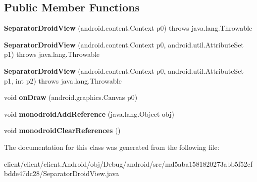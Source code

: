 \subsection*{Public Member Functions}
\begin{DoxyCompactItemize}
\item 
\hypertarget{classmd5aba1581820273abb5f52cfbdde47dc28_1_1SeparatorDroidView_a0ba746597f05250d7bbcbb774032b9b0}{}{\bfseries Separator\+Droid\+View} (android.\+content.\+Context p0)  throws java.\+lang.\+Throwable 	\label{classmd5aba1581820273abb5f52cfbdde47dc28_1_1SeparatorDroidView_a0ba746597f05250d7bbcbb774032b9b0}

\item 
\hypertarget{classmd5aba1581820273abb5f52cfbdde47dc28_1_1SeparatorDroidView_afcd095259b4a9c9ab8c5a89c4f0008aa}{}{\bfseries Separator\+Droid\+View} (android.\+content.\+Context p0, android.\+util.\+Attribute\+Set p1)  throws java.\+lang.\+Throwable 	\label{classmd5aba1581820273abb5f52cfbdde47dc28_1_1SeparatorDroidView_afcd095259b4a9c9ab8c5a89c4f0008aa}

\item 
\hypertarget{classmd5aba1581820273abb5f52cfbdde47dc28_1_1SeparatorDroidView_a8a45855468bb357254d32b6b90fdcd3e}{}{\bfseries Separator\+Droid\+View} (android.\+content.\+Context p0, android.\+util.\+Attribute\+Set p1, int p2)  throws java.\+lang.\+Throwable 	\label{classmd5aba1581820273abb5f52cfbdde47dc28_1_1SeparatorDroidView_a8a45855468bb357254d32b6b90fdcd3e}

\item 
\hypertarget{classmd5aba1581820273abb5f52cfbdde47dc28_1_1SeparatorDroidView_aaaa76fa0a36bd48050a89d42bc2a3b98}{}void {\bfseries on\+Draw} (android.\+graphics.\+Canvas p0)\label{classmd5aba1581820273abb5f52cfbdde47dc28_1_1SeparatorDroidView_aaaa76fa0a36bd48050a89d42bc2a3b98}

\item 
\hypertarget{classmd5aba1581820273abb5f52cfbdde47dc28_1_1SeparatorDroidView_a7c0af0c1e076b652149c1ef42e4085dc}{}void {\bfseries monodroid\+Add\+Reference} (java.\+lang.\+Object obj)\label{classmd5aba1581820273abb5f52cfbdde47dc28_1_1SeparatorDroidView_a7c0af0c1e076b652149c1ef42e4085dc}

\item 
\hypertarget{classmd5aba1581820273abb5f52cfbdde47dc28_1_1SeparatorDroidView_af4aa399c98169ba78c4efa2e9d898d93}{}void {\bfseries monodroid\+Clear\+References} ()\label{classmd5aba1581820273abb5f52cfbdde47dc28_1_1SeparatorDroidView_af4aa399c98169ba78c4efa2e9d898d93}

\end{DoxyCompactItemize}


The documentation for this class was generated from the following file\+:\begin{DoxyCompactItemize}
\item 
client/client/client.\+Android/obj/\+Debug/android/src/md5aba1581820273abb5f52cfbdde47dc28/Separator\+Droid\+View.\+java\end{DoxyCompactItemize}
